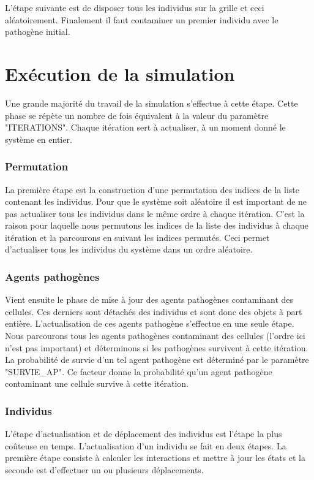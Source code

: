 L'étape suivante est de disposer tous les individus sur la grille et ceci aléatoirement. Finalement il faut contaminer un premier individu avec le pathogène initial. 

\section{Exécution de la simulation}

Une grande majorité du travail de la simulation s'effectue à cette étape. Cette phase se répète un nombre de fois équivalent à la valeur du paramètre {\small "ITERATIONS"}. Chaque itération sert à actualiser, à un moment donné le système en entier.

\subsubsection{Permutation}

La première étape est la construction d'une permutation des indices de la liste contenant les individus. Pour que le système soit aléatoire il est important de ne pas actualiser tous les individus dans le même ordre à chaque itération. C'est la raison pour laquelle nous permutons les indices de la liste des individus à chaque itération et la parcourons en suivant les indices permutés. Ceci permet d'actualiser tous les individus du système dans un ordre aléatoire.

\subsubsection{Agents pathogènes}

Vient ensuite le phase de mise à jour des agents pathogènes contaminant des cellules. Ces derniers sont détachés des individus et sont donc des objets à part entière. L'actualisation de ces agents pathogène s'effectue en une seule étape. Nous parcourons tous les agents pathogènes contaminant des cellules (l'ordre ici n'est pas important) et déterminons si les pathogènes survivent à cette itération. La probabilité de survie d'un tel agent pathogène est déterminé par le paramètre {\small "SURVIE\_AP"}. Ce facteur donne la probabilité qu'un agent pathogène contaminant une cellule survive à cette itération.

\subsubsection{Individus}

L'étape d'actualisation et de déplacement des individus est l'étape la plus coûteuse en temps. L'actualisation d'un individu se fait en deux étapes. La première étape consiste à calculer les interactions et mettre à jour les états et la seconde est d'effectuer un ou plusieurs déplacements.\\

